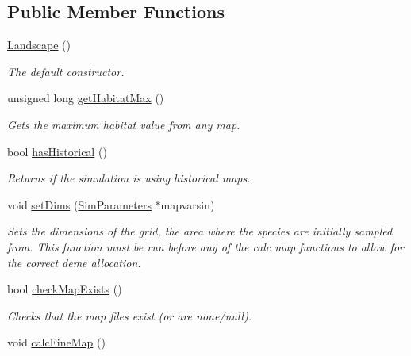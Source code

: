\subsection*{Public Member Functions}
\begin{DoxyCompactItemize}
\item 
\hyperlink{class_landscape_a0a54d8aabc38c0a5aa27ccace3f91915}{Landscape} ()\hypertarget{class_landscape_a0a54d8aabc38c0a5aa27ccace3f91915}{}\label{class_landscape_a0a54d8aabc38c0a5aa27ccace3f91915}

\begin{DoxyCompactList}\small\item\em The default constructor. \end{DoxyCompactList}\item 
unsigned long \hyperlink{class_landscape_a99fac44043825a97e2e7fbc71caeb8e2}{get\+Habitat\+Max} ()
\begin{DoxyCompactList}\small\item\em Gets the maximum habitat value from any map. \end{DoxyCompactList}\item 
bool \hyperlink{class_landscape_ad8e9a0520be7426592aa1d8c91227f3e}{has\+Historical} ()
\begin{DoxyCompactList}\small\item\em Returns if the simulation is using historical maps. \end{DoxyCompactList}\item 
void \hyperlink{class_landscape_acc47e50bdad6af7f2bbed57db73f6730}{set\+Dims} (\hyperlink{struct_sim_parameters}{Sim\+Parameters} $\ast$mapvarsin)
\begin{DoxyCompactList}\small\item\em Sets the dimensions of the grid, the area where the species are initially sampled from. This function must be run before any of the calc map functions to allow for the correct deme allocation. \end{DoxyCompactList}\item 
bool \hyperlink{class_landscape_ab7d8cd906a44c24a7f120362563d1217}{check\+Map\+Exists} ()
\begin{DoxyCompactList}\small\item\em Checks that the map files exist (or are none/null). \end{DoxyCompactList}\item 
void \hyperlink{class_landscape_ad500af94a2afd577e682b3c042cab217}{calc\+Fine\+Map} ()\hypertarget{class_landscape_ad500af94a2afd577e682b3c042cab217}{}\label{class_landscape_ad500af94a2afd577e682b3c042cab217}


\end{DoxyCompactItemize}

